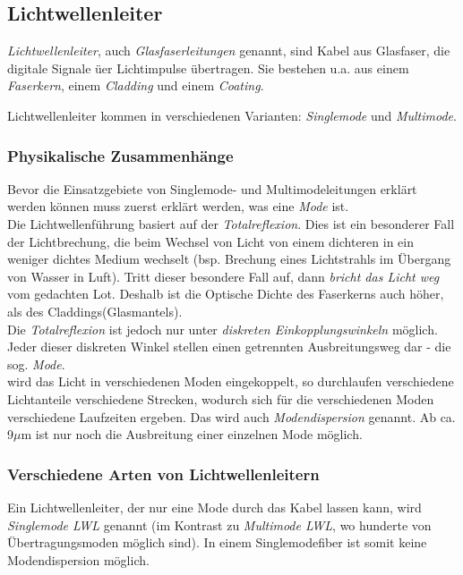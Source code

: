 \documentclass[a4paper, 12pt]{report}
\begin{document}
\subsection{Lichtwellenleiter}

\emph{Lichtwellenleiter}, auch \emph{Glasfaserleitungen} genannt, sind
Kabel aus Glasfaser, die digitale Signale üer Lichtimpulse übertragen. Sie
bestehen u.a. aus einem \emph{Faserkern}, einem \emph{Cladding} und einem
\emph{Coating}.

Lichtwellenleiter kommen in verschiedenen Varianten: \emph{Singlemode} und
\emph{Multimode}.

\subsubsection{Physikalische Zusammenhänge}

Bevor die Einsatzgebiete von Singlemode- und Multimodeleitungen erklärt werden
können muss zuerst erklärt werden, was eine \emph{Mode} ist. \\

Die Lichtwellenführung basiert auf der \emph{Totalreflexion}. Dies ist ein
besonderer Fall der Lichtbrechung, die beim Wechsel von Licht von einem
dichteren in ein weniger dichtes Medium wechselt (bsp. Brechung eines
Lichtstrahls im Übergang von Wasser in Luft). Tritt dieser besondere Fall auf,
dann \emph{bricht das Licht weg} vom gedachten \glqq Lot\grqq{}. Deshalb
ist die Optische Dichte des Faserkerns auch höher, als des
Claddings(Glasmantels). \\

Die \emph{Totalreflexion} ist jedoch nur unter \emph{diskreten
Einkopplungswinkeln} möglich. Jeder dieser diskreten Winkel stellen einen
getrennten Ausbreitungsweg dar - die sog. \emph{Mode}. \\

wird das Licht in verschiedenen Moden eingekoppelt, so durchlaufen verschiedene
Lichtanteile verschiedene Strecken, wodurch sich für die verschiedenen Moden
verschiedene Laufzeiten ergeben. Das wird auch \emph{Modendispersion}
genannt. Ab ca. 9$\mu$m ist nur noch die Ausbreitung einer einzelnen Mode
möglich.

\newpage
\subsubsection{Verschiedene Arten von Lichtwellenleitern}

Ein Lichtwellenleiter, der nur eine Mode durch das Kabel lassen kann, wird
\emph{Singlemode LWL} genannt (im Kontrast zu \emph{Multimode LWL}, wo
hunderte von Übertragungsmoden möglich sind). In einem Singlemodefiber ist somit
keine Modendispersion möglich. \\
\end{document}
